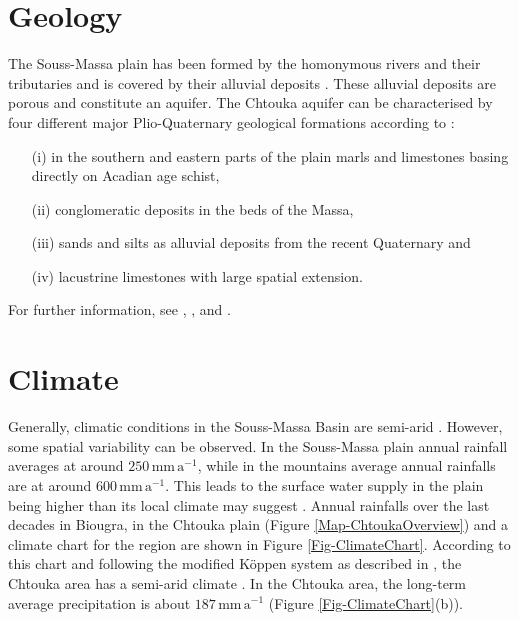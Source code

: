 \section{Geology}
\label{Sec-SouMaGeology}

The Souss-Massa plain has been formed by the homonymous rivers and their tributaries and is covered by their alluvial deposits \parencite{Hssaisoune.2017}. 
These alluvial deposits are porous and constitute an aquifer. 
The Chtouka aquifer can be characterised by four different major Plio-Quaternary geological formations according to \textcite{Malki.2017}: 
    \begin{itemize}
        \item[(i)] in the southern and eastern parts of the plain marls and limestones basing directly on Acadian age schist, 
        \item[(ii)] conglomeratic deposits in the beds of the Massa, 
        \item[(iii)] sands and silts as alluvial deposits from the recent Quaternary and
        \item[(iv)] lacustrine limestones with large spatial extension.
    \end{itemize}
For further information, see \cite{Choubert.1964}, \cite{Hssaisoune.2017}, \cite{Horn.2021} and \cite{Krimissa.2004}.

\section{Climate}
\label{Sec-SouMaClimate}

Generally, climatic conditions in the Souss-Massa Basin are semi-arid \parencite{Choukr.2017}. 
However, some spatial variability can be observed. 
In the Souss-Massa plain annual rainfall averages at around $250 \, \textrm{mm} \, \textrm{a}^{-1}$, while in the mountains average annual rainfalls are at around $600 \, \textrm{mm} \, \textrm{a}^{-1}$. 
This leads to the surface water supply in the plain being higher than its local climate may suggest \parencite{Hssaisoune.2017}. 
Annual rainfalls over the last decades in Biougra, in the Chtouka plain (Figure \ref{Map-ChtoukaOverview}) and a climate chart for the region are shown in Figure \ref{Fig-ClimateChart}. 
According to this chart and following the modified Köppen system as described in \textcite{Critchfield.1983}, the Chtouka area has a semi-arid climate \parencite{Choukr.2017}. 
In the Chtouka area, the long-term average precipitation is about $ 187 \, \textrm{mm} \, \textrm{a}^{-1}$ (Figure \ref{Fig-ClimateChart}(b)).

